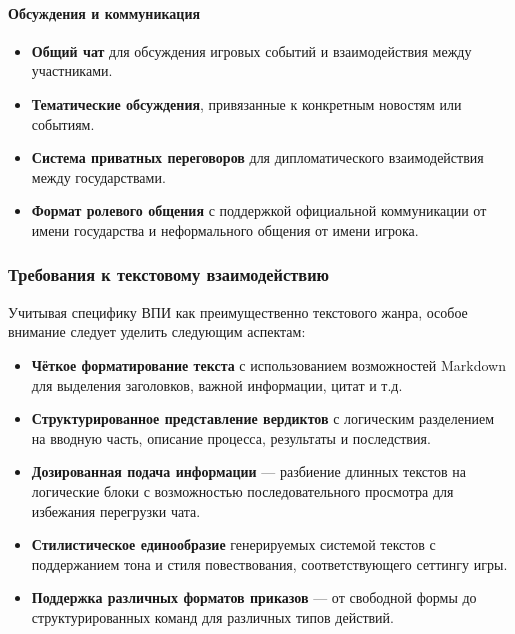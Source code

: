 \paragraph{Обсуждения и коммуникация}

\begin{itemize}
    \item \textbf{Общий чат} для обсуждения игровых событий и взаимодействия между участниками.

    \item \textbf{Тематические обсуждения}, привязанные к конкретным новостям или событиям.

    \item \textbf{Система приватных переговоров} для дипломатического взаимодействия между государствами.

    \item \textbf{Формат ролевого общения} с поддержкой официальной коммуникации от имени государства и неформального общения от имени игрока.
\end{itemize}

\subsubsection{Требования к текстовому взаимодействию}

Учитывая специфику ВПИ как преимущественно текстового жанра, особое внимание следует уделить следующим аспектам:

\begin{itemize}
    \item \textbf{Чёткое форматирование текста} с использованием возможностей Markdown для выделения заголовков, важной информации, цитат и т.д.

    \item \textbf{Структурированное представление вердиктов} с логическим разделением на вводную часть, описание процесса, результаты и последствия.

    \item \textbf{Дозированная подача информации} — разбиение длинных текстов на логические блоки с возможностью последовательного просмотра для избежания перегрузки чата.

    \item \textbf{Стилистическое единообразие} генерируемых системой текстов с поддержанием тона и стиля повествования, соответствующего сеттингу игры.

    \item \textbf{Поддержка различных форматов приказов} — от свободной формы до структурированных команд для различных типов действий.
\end{itemize}

